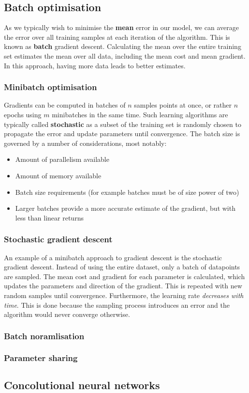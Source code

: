 \documentclass[CS5104-Notes.tex]{subfiles}
\begin{document}
\subsection{Batch optimisation}
As we typically wish to minimise the \textbf{mean} error in our model, we can average the error over all training samples at each iteration of the algorithm. This is known as \textbf{batch} gradient descent. Calculating the mean over the entire training set estimates the mean over all data, including the mean cost and mean gradient. In this approach, having more data leads to better estimates.

\subsubsection{Minibatch optimisation}
Gradients can be computed in batches of $n$ samples points at once, or rather $n$ epochs using $m$ minibatches in the same time. Such learning algorithms are typically called \textbf{stochastic} as a subset of the training set is randomly chosen to propagate the error and update parameters until convergence.
\n
The batch size is governed by a number of considerations, most notably:
\begin{itemize}
\item Amount of parallelism available
\item Amount of memory available
\item Batch size requirements (for example batches must be of size power of two)
\item Larger batches provide a more accurate estimate of the gradient, but with less than linear returns
\end{itemize}

\subsubsection{Stochastic gradient descent}
An example of a minibatch approach to gradient descent is the stochastic gradient descent. Instead of using the entire dataset, only a batch of datapoints are sampled. The mean cost and gradient for each parameter is calculated, which updates the parameters and direction of the gradient. This is repeated with new random samples until convergence.
\n
Furthermore, the learning rate \textit{decreases with time}. This is done because the sampling process introduces an error and the algorithm would never converge otherwise.

\subsubsection{Batch noramlisation}

\subsubsection{Parameter sharing}


\subsection{Concolutional neural networks}
\end{document}
